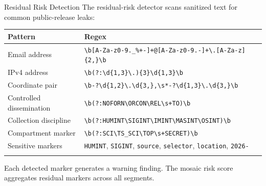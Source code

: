 \documentclass[
  ignorenonframetext,
]{beamer}
\newcounter{none} %
\begin{document}
\begin{frame}{Residual Risk Detection}
\protect{}\label{residual-risk-detection}
The residual-risk detector scans sanitized text for common
public-release leaks:

{\def\LTcaptype{none} %
\begin{longtable}[]{@{}
  >{\raggedright\arraybackslash}p{}
  >{\raggedright\arraybackslash}p{}@{}}
\toprule\noalign{}
\begin{minipage}[b]{\linewidth}\raggedright
Pattern
\end{minipage} & \begin{minipage}[b]{\linewidth}\raggedright
Regex
\end{minipage} \\
\midrule\noalign{}
\endhead
Email address &
\texttt{\textbackslash{}b{[}A-Za-z0-9.\_\%+-{]}+@{[}A-Za-z0-9.-{]}+\textbackslash{}.{[}A-Za-z{]}\{2,\}\textbackslash{}b} \\
IPv4 address &
\texttt{\textbackslash{}b(?:\textbackslash{}d\{1,3\}\textbackslash{}.)\{3\}\textbackslash{}d\{1,3\}\textbackslash{}b} \\
Coordinate pair &
\texttt{\textbackslash{}b-?\textbackslash{}d\{1,2\}\textbackslash{}.\textbackslash{}d\{3,\},\textbackslash{}s*-?\textbackslash{}d\{1,3\}\textbackslash{}.\textbackslash{}d\{3,\}\textbackslash{}b} \\
Controlled dissemination &
\texttt{\textbackslash{}b(?:NOFORN\textbackslash{}\textbar{}ORCON\textbackslash{}\textbar{}REL\textbackslash{}s+TO)\textbackslash{}b} \\
Collection discipline &
\texttt{\textbackslash{}b(?:HUMINT\textbackslash{}\textbar{}SIGINT\textbackslash{}\textbar{}IMINT\textbackslash{}\textbar{}MASINT\textbackslash{}\textbar{}OSINT)\textbackslash{}b} \\
Compartment marker &
\texttt{\textbackslash{}b(?:SCI\textbackslash{}\textbar{}TS\_SCI\textbackslash{}\textbar{}TOP\textbackslash{}s+SECRET)\textbackslash{}b} \\
Sensitive markers & \texttt{HUMINT}, \texttt{SIGINT}, \texttt{source},
\texttt{selector}, \texttt{location}, \texttt{2026-} \\
\bottomrule\noalign{}
\end{longtable}
}

Each detected marker generates a warning finding. The mosaic risk score
aggregates residual markers across all segments.
\end{frame}
\end{document}
